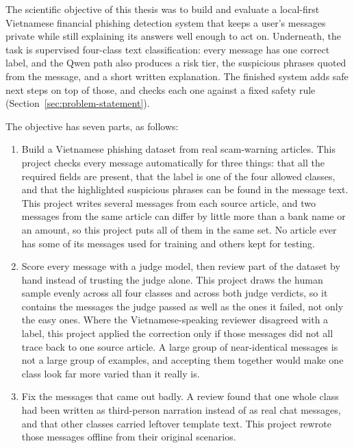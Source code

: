 
The scientific objective of this thesis was to build and evaluate a
local-first Vietnamese financial phishing detection system that keeps a
user's messages private while still explaining its answers well enough to
act on. Underneath, the task is supervised four-class text classification:
every message has one correct label, and the Qwen path also produces a risk
tier, the suspicious phrases quoted from the message, and a short written
explanation. The finished system adds safe next steps on top of those, and
checks each one against a fixed safety rule (Section~\ref{sec:problem-statement}).

The objective has seven parts, as follows:

\begin{enumerate}
  \item Build a Vietnamese phishing dataset from real scam-warning
  articles. This project checks every message automatically for three
  things: that all the required fields are present, that the label is one
  of the four allowed classes, and that the highlighted suspicious phrases
  can be found in the message text. This project writes several messages
  from each source article, and two messages from the same article can
  differ by little more than a bank name or an amount, so this project puts
  all of them in the same set. No article ever has some of its messages
  used for training and others kept for testing.

  \item Score every message with a judge model, then review part of the
  dataset by hand instead of trusting the judge alone. This project draws
  the human sample evenly across all four classes and across both judge
  verdicts, so it contains the messages the judge passed as well as the
  ones it failed, not only the easy ones. Where the Vietnamese-speaking
  reviewer disagreed with a label, this project applied the correction only
  if those messages did not all trace back to one source article. A large
  group of near-identical messages is not a large group of examples, and
  accepting them together would make one class look far more varied than it
  really is.

  \item Fix the messages that came out badly. A review found that one whole
  class had been written as third-person narration instead of as real chat
  messages, and that other classes carried leftover template text. This
  project rewrote those messages offline from their original scenarios.


\end{enumerate}
